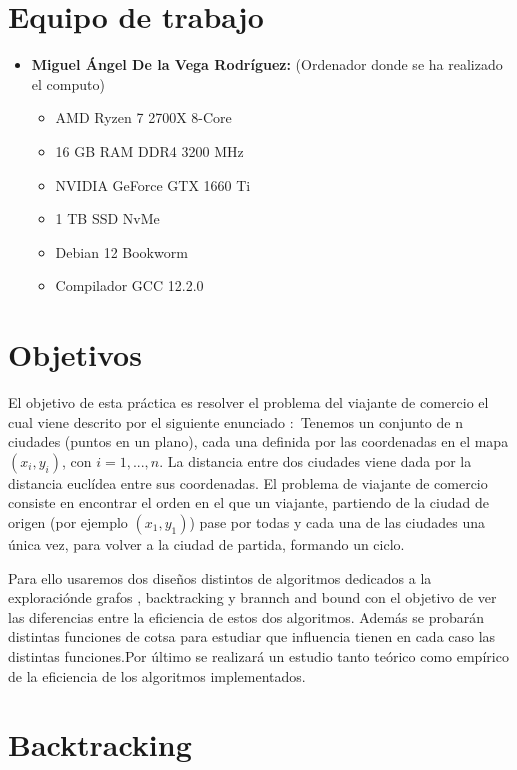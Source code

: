 \documentclass[11pt,openany]{book}
\begin{document}
\chapter{Equipo de trabajo}

\begin{itemize}
      \item \textbf{Miguel Ángel De la Vega Rodríguez:} (Ordenador donde se ha realizado el computo)
            \begin{itemize}
                  \item AMD Ryzen 7 2700X 8-Core
                  \item 16 GB RAM DDR4 3200 MHz
                  \item NVIDIA GeForce GTX 1660 Ti
                  \item 1 TB SSD NvMe
                  \item Debian 12 Bookworm
                  \item Compilador GCC 12.2.0
            \end{itemize}
\end{itemize}

\chapter{Objetivos}
    El objetivo de esta práctica es resolver el problema del viajante de comercio el cual viene descrito por el siguiente enunciado :\
    Tenemos un conjunto de n ciudades (puntos en un plano), cada una definida por las coordenadas en el mapa $(x_i , y_i )$, con $i = 1, . . . , n$. La distancia entre dos ciudades viene dada por la
    distancia euclídea entre sus coordenadas.
    El problema de viajante de comercio consiste en encontrar el orden en el que un viajante,
    partiendo de la ciudad de origen (por ejemplo $(x_1 , y_1 )$) pase por todas y cada una de las ciudades
    una única vez, para volver a la ciudad de partida, formando un ciclo. \ 

    Para ello usaremos dos diseños distintos de  algoritmos dedicados a la exploraciónde grafos , backtracking y brannch and bound 
    con el objetivo de ver las diferencias entre la eficiencia de estos dos algoritmos. Además se probarán distintas funciones de cotsa 
    para estudiar que influencia tienen en cada caso las distintas funciones.Por último se realizará un estudio tanto teórico como 
    empírico de la eficiencia de los algoritmos implementados.
\chapter{Backtracking}   
\end{document}
